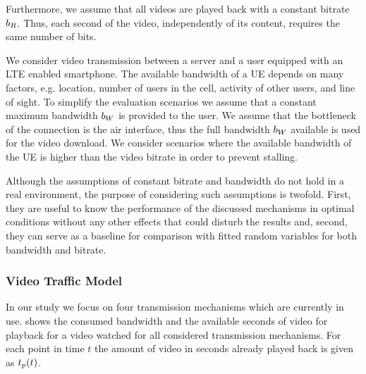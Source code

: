 Furthermore, we assume that all videos are played back with a constant bitrate \(b_R\).
Thus, each second of the video, independently of its content, requires the same number of bits.

We consider video transmission between a server and a user equipped with an \gls{LTE} enabled smartphone.
The available bandwidth of a \gls{UE} depends on many factors, e.g. location, number of users in the cell, activity of other users, and line of sight.
To simplify the evaluation scenarios we assume that a constant maximum bandwidth \(b_W\) is provided to the user.
We assume that the bottleneck of the connection is the air interface, thus the full bandwidth \(b_W\) available is used for the video download.
We consider scenarios where the available bandwidth of the \gls{UE} is higher than the video bitrate in order to prevent stalling.

Although the assumptions of constant bitrate and bandwidth do not hold in a real environment, the purpose of considering such assumptions is twofold. First, they are useful to know the performance of the discussed mechanisms in optimal conditions without any other effects that could disturb the results and, second, they can serve as a baseline for comparison with fitted random variables for both bandwidth and bitrate.

\subsubsection*{Video Traffic Model}\label{sec:application:lte_video:system_model:video_traffic}

In our study we focus on four transmission mechanisms which are currently in use.
 shows the consumed bandwidth and the available seconds of video for playback for a video watched for all considered transmission mechanisms.
For each point in time \(t\) the amount of video in seconds already played back is given as \(t_p(t)\).

